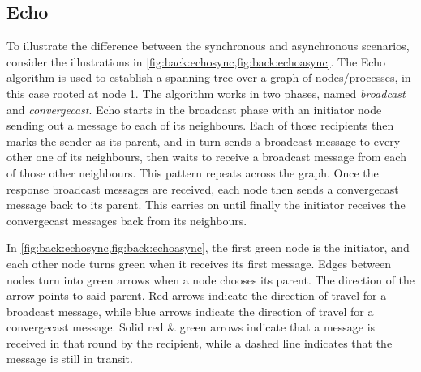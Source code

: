 \subsection{Echo}
To illustrate the difference between the synchronous and asynchronous scenarios, consider the illustrations in \cref{fig:back:echosync,fig:back:echoasync}.  The Echo algorithm \cite[Ch.~4.3]{Fokkink2013} is used to establish a spanning tree over a graph of nodes/processes, in this case rooted at node 1.  The algorithm works in two phases, named \emph{broadcast} and \emph{convergecast}.  Echo starts in the broadcast phase with an initiator node sending out a message to each of its neighbours.  Each of those recipients then marks the sender as its parent, and in turn sends a broadcast message to every other one of its neighbours, then waits to receive a broadcast message from each of those other neighbours.  This pattern repeats across the graph.  Once the response broadcast messages are received, each node then sends a convergecast message back to its parent.  This carries on until finally the initiator receives the convergecast messages back from its neighbours.

In \cref{fig:back:echosync,fig:back:echoasync}, the first green node is the initiator, and each other node turns green when it receives its first message.  Edges between nodes turn into green arrows when a node chooses its parent.  The direction of the arrow points to said parent.  Red arrows indicate the direction of travel for a broadcast message, while blue arrows indicate the direction of travel for a convergecast message.  Solid red \& green arrows indicate that a message is received in that round by the recipient, while a dashed line indicates that the message is still in transit.

